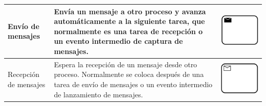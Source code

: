 \begin{table}[H]
\begin{tabular}{|p{2cm}|p{9.5cm}|p{1.7cm} |}
	\hline
	{\small Envío de mensajes } & {\small Envía un mensaje a otro proceso y avanza automáticamente a la siguiente tarea, que normalmente es una tarea de recepción o un evento intermedio de captura de mensajes.} & \vspace{0.5mm} \hspace{2mm} \includegraphics[scale=0.1]{Capitulo2/imagenes/TEMensaje} \\
	\hline
	
	{\small Recepción de mensajes } & {\small Espera la recepción de un mensaje desde otro proceso. Normalmente se coloca después de una tarea de envío de mensajes o un evento intermedio de lanzamiento de mensajes.} & \vspace{0.5mm} \hspace{2mm} \includegraphics[scale=0.1]{Capitulo2/imagenes/TRMensaje} \\
		

\end{tabular}
\end{table}
